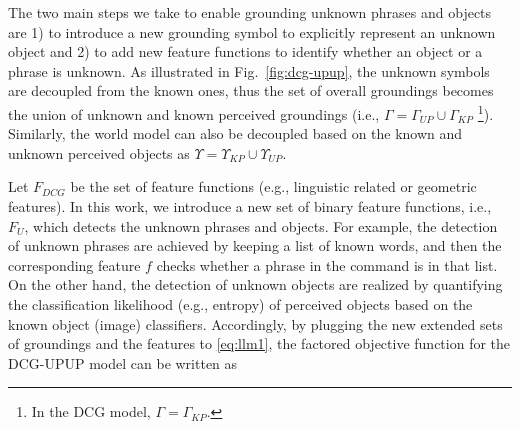 The two main steps we take to enable grounding unknown phrases and objects are 1) to introduce a new grounding symbol to explicitly represent an unknown object and 2) to add new feature functions to identify whether an object or a phrase is unknown. As illustrated in Fig.~\ref{fig:dcg-upup}, the unknown symbols are decoupled from the known ones, thus the set of overall groundings becomes the union of unknown and known perceived groundings (i.e., $\Gamma = \Gamma_{UP} \cup \Gamma_{KP}$ \footnote{In the DCG model, $\Gamma = \Gamma_{KP}$.}). Similarly, the world model can also be decoupled based on the known and unknown perceived objects as $\Upsilon = \Upsilon_{KP} \cup \Upsilon_{UP}$.

Let $F_{DCG}$ be the set of feature functions (e.g., linguistic related or geometric features). In this work, we introduce a new set of binary feature functions, i.e., $F_U$, which detects the unknown phrases and objects. For example, the detection of unknown phrases are achieved by keeping a list of known words, and then the corresponding feature $f$ checks whether a phrase in the command is in that list. On the other hand, the detection of unknown objects are realized by quantifying the classification likelihood (e.g., entropy) of perceived objects based on the known object (image) classifiers. Accordingly, by plugging the new extended sets of groundings and the features to \eqref{eq:llm1}, the factored objective function for the DCG-UPUP model can be written as      


